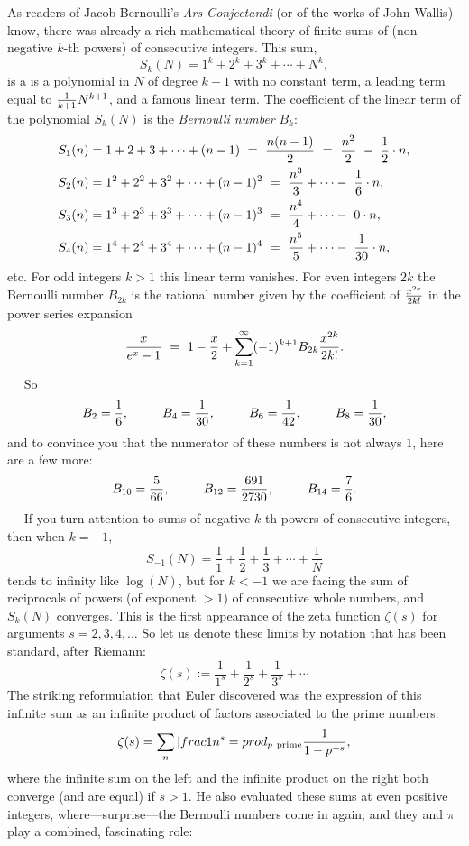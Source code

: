 \documentclass[openany]{book}
\theoremstyle{plain}
\theoremstyle{definition}
\begin{document}
As readers of Jacob Bernoulli's {\it Ars Conjectandi} (or of the works
of John Wallis) know, there was already a rich mathematical theory of
finite sums of (non-negative $k$-th powers) of consecutive integers.
This sum, $$S_k(N) = 1^k+2^k+3^k+\cdots +N^k,$$ is a is a polynomial
in $N$ of degree $k+1$ with no constant term, a leading term equal to
${1\over k+1}N^{k+1}$, and a famous linear term.  The coefficient of
the linear term of the polynomial $S_k(N)$ is the {\it Bernoulli
  number} $B_{k}$:
\begin{align*}
S_1(n) &= 1+2+3+ \dots + (n-1) \ = \ {n(n-1)\over 2}  \ = \  {n^2\over 2}\ -\  {1\over 2}\cdot n,\\
S_2(n) &= 1^2+2^2+3^2+ \dots + (n-1)^2 \ = \   {n^3\over 3} +\cdots -\ {1\over 6}\cdot n,\\
S_3(n) &= 1^3+2^3+3^3+ \dots + (n-1)^3 \ = \  {n^4\over 4} +\cdots  -\ 0\cdot n,\\
S_4(n) &= 1^4+2^4+3^4+ \dots + (n-1)^4 \ = \  {n^5\over 5} +\cdots  -\ {1\over 30}\cdot n,
\end{align*}
etc.   
For odd integers $k
> 1$ this linear term vanishes.  For even integers $2k$ the  Bernoulli number
$B_{2k}$ is the rational number given by the coefficient of ${x^{2k}\over {2k}!}$ in the power series expansion 
\    \newline \bigskip \     \newline
$${x\over e^x-1} \ = \  1 - {x\over 2} +  \sum_{k=1}^{\infty}
(-1)^{k+1}B_{2k}{x^{2k}\over {2k}!}.$$
\    \newline \bigskip \     \newline
So
  $$ B_2 = {1\over 6},\ \ \ \ \ \ \ \   B_4 = {1\over 30},\ \ \ \ \ \ \ \   B_6 = {1\over 42},\ \ \ \ \ \ \
\   B_8 = {1\over 30},$$ and to convince you that the numerator of these numbers is not always $1$, here are
a few more: 
$$B_{10} = {5\over 66},\ \ \ \ \ \ \ \   B_{12}= {691\over 2730},\ \ \ \ \ \ \ \  B_{14} = {7\over 6}.$$
\    \newline \bigskip \     \newline 
If you turn attention to sums of negative $k$-th powers of consecutive
integers, then when $k= -1$, $$S_{-1}(N)= {\frac{1}{1}}+
{\frac{1}{2}}+ {\frac{1}{3}}+ \cdots+ {\frac{1}{N}}$$ tends to infinity
like $\log(N)$, but for $k < -1$ we are facing the sum of reciprocals
of powers (of exponent $>1$) of consecutive whole numbers, and
$S_k(N)$ converges. This is the first appearance of the zeta function
$\zeta(s)$ for arguments $s=2,3,4,\dots$ So let us denote these limits
by notation that has been standard, after Riemann:
$$\zeta(s):=  {\frac{1}{1^s}}+ {\frac{1}{2^s}}+ {\frac{1}{3^s}}+ \cdots$$  
The striking reformulation that Euler discovered was the expression of
this infinite sum as an infinite product of factors associated to the
prime numbers:
$$\zeta(s)=\sum_n{|frac{1}{n^s}} = prod_{p \ {\rm prime}}{\frac{1}{1-p^{-s}}},$$  
where the infinite sum on the left and the infinite product on the
right both converge (and are equal) if $s > 1$. He also evaluated these
sums at even positive integers, where---surprise---the Bernoulli
numbers come in again; and they and $\pi$ play a combined, fascinating
role:
\end{document}
